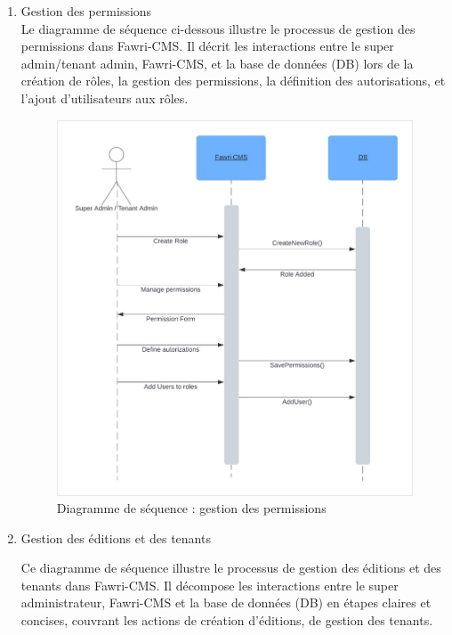 \begin{enumerate}
  \item Gestion des permissions\\
        \hspace{\parindent}Le diagramme de séquence ci-dessous illustre le processus de gestion des permissions dans Fawri-CMS. Il décrit les interactions entre le super admin/tenant admin, Fawri-CMS, et la base de données (DB) lors de la création de rôles, la gestion des permissions, la définition des autorisations, et l'ajout d'utilisateurs aux rôles.
        \begin{figure}[H]
          \centering
          \includegraphics[width=11cm]{Figures/diagsec_Gestion_permissions.png}
          \caption{Diagramme de séquence : gestion des permissions}
        \end{figure}



  \item Gestion des éditions et des tenants

        \hspace{\parindent}Ce diagramme de séquence illustre le processus de gestion des éditions et des tenants dans Fawri-CMS. Il décompose les interactions entre le super administrateur, Fawri-CMS et la base de données (DB) en étapes claires et concises, couvrant les actions de création d'éditions, de gestion des tenants.


\end{enumerate}
